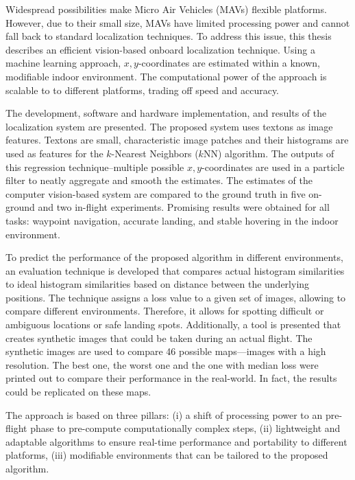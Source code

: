 Widespread possibilities make Micro Air Vehicles (MAVs) flexible platforms.
However, due to their small size, MAVs have limited processing power and cannot
fall back to standard localization techniques. To address this
issue, this thesis describes an efficient vision-based onboard localization
technique. Using a machine
learning approach, $x,y$-coordinates are estimated within a known, modifiable indoor
environment. The computational power of the approach is scalable to to different platforms, trading off speed and accuracy.

The development, software and hardware
implementation, and results of the localization system are presented. The proposed system uses 
textons as image features. Textons are small, characteristic image patches and their histograms are used as features for the $k$-Nearest Neighbors ($k$NN)
algorithm. The outputs of this regression technique--multiple possible
$x, y$-coordinates are used in a particle filter to neatly aggregate
and smooth the estimates. The estimates of the computer vision-based
system are compared to the ground truth in five on-ground and two
in-flight experiments. Promising results were obtained for all tasks:
waypoint navigation, accurate landing, and stable hovering in the
indoor environment.

To predict the performance of the proposed algorithm in different environments, an evaluation
technique is developed that compares actual histogram similarities to
ideal histogram similarities based on distance between the underlying
positions. The technique assigns a loss value to a given set of
images, allowing to compare different environments. Therefore, it
allows for spotting difficult or ambiguous locations or safe landing
spots. Additionally, a tool is presented that creates synthetic images
that could be taken during an actual flight. The synthetic images are
used to compare 46 possible maps---images with a high resolution. The
best one, the worst one and the one with median loss were printed out
to compare their performance in the real-world. In fact, the results
could be replicated on these maps.

The approach is based on three pillars: (i) a shift of processing power to an pre-flight phase to pre-compute
computationally complex steps, (ii) lightweight and adaptable algorithms to ensure real-time performance and portability to different platforms,
(iii) modifiable environments that can be tailored to the proposed algorithm. 